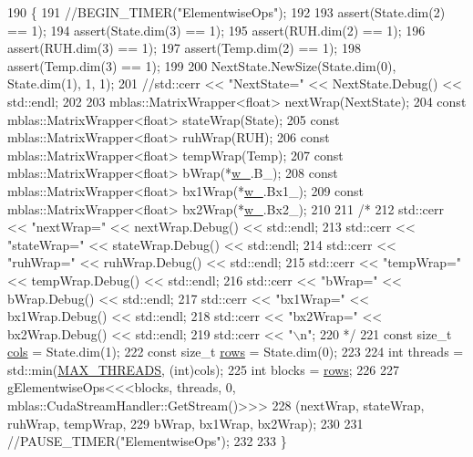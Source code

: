 \begin{DoxyCode}
190     \{
191       \textcolor{comment}{//BEGIN\_TIMER("ElementwiseOps");}
192 
193       assert(State.dim(2) == 1);
194       assert(State.dim(3) == 1);
195       assert(RUH.dim(2) == 1);
196       assert(RUH.dim(3) == 1);
197       assert(Temp.dim(2) == 1);
198       assert(Temp.dim(3) == 1);
199 
200       NextState.NewSize(State.dim(0), State.dim(1), 1, 1);
201       \textcolor{comment}{//std::cerr << "NextState=" << NextState.Debug() << std::endl;}
202 
203       mblas::MatrixWrapper<float> nextWrap(NextState);
204       \textcolor{keyword}{const} mblas::MatrixWrapper<float> stateWrap(State);
205       \textcolor{keyword}{const} mblas::MatrixWrapper<float> ruhWrap(RUH);
206       \textcolor{keyword}{const} mblas::MatrixWrapper<float> tempWrap(Temp);
207       \textcolor{keyword}{const} mblas::MatrixWrapper<float> bWrap(*\hyperlink{classamunmt_1_1GPU_1_1FastGRU_a299bff28c9a4fb76e3fdf423137e24a2}{w\_}.B\_);
208       \textcolor{keyword}{const} mblas::MatrixWrapper<float> bx1Wrap(*\hyperlink{classamunmt_1_1GPU_1_1FastGRU_a299bff28c9a4fb76e3fdf423137e24a2}{w\_}.Bx1\_);
209       \textcolor{keyword}{const} mblas::MatrixWrapper<float> bx2Wrap(*\hyperlink{classamunmt_1_1GPU_1_1FastGRU_a299bff28c9a4fb76e3fdf423137e24a2}{w\_}.Bx2\_);
210 
211       \textcolor{comment}{/*}
212 \textcolor{comment}{      std::cerr << "nextWrap=" << nextWrap.Debug() << std::endl;}
213 \textcolor{comment}{      std::cerr << "stateWrap=" << stateWrap.Debug() << std::endl;}
214 \textcolor{comment}{      std::cerr << "ruhWrap=" << ruhWrap.Debug() << std::endl;}
215 \textcolor{comment}{      std::cerr << "tempWrap=" << tempWrap.Debug() << std::endl;}
216 \textcolor{comment}{      std::cerr << "bWrap=" << bWrap.Debug() << std::endl;}
217 \textcolor{comment}{      std::cerr << "bx1Wrap=" << bx1Wrap.Debug() << std::endl;}
218 \textcolor{comment}{      std::cerr << "bx2Wrap=" << bx2Wrap.Debug() << std::endl;}
219 \textcolor{comment}{      std::cerr << "\(\backslash\)n";}
220 \textcolor{comment}{      */}
221       \textcolor{keyword}{const} \textcolor{keywordtype}{size\_t} \hyperlink{namespacemarian_ab9fbdcc76cc853270094524572584222}{cols} = State.dim(1);
222       \textcolor{keyword}{const} \textcolor{keywordtype}{size\_t} \hyperlink{namespacemarian_ace1e9a63d52edc363d70d661cf8d0257}{rows} = State.dim(0);
223 
224       \textcolor{keywordtype}{int} threads = std::min(\hyperlink{matrix__functions_8h_a8b5173357adb02a86c027316e0acdfa0}{MAX\_THREADS}, (\textcolor{keywordtype}{int})cols);
225       \textcolor{keywordtype}{int} blocks  = \hyperlink{namespacemarian_ace1e9a63d52edc363d70d661cf8d0257}{rows};
226 
227       gElementwiseOps<<<blocks, threads, 0, mblas::CudaStreamHandler::GetStream()>>>
228         (nextWrap, stateWrap, ruhWrap, tempWrap,
229             bWrap, bx1Wrap, bx2Wrap);
230 
231       \textcolor{comment}{//PAUSE\_TIMER("ElementwiseOps");}
232 
233     \}
\end{DoxyCode}



